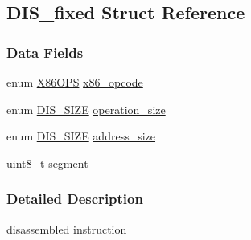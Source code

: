\hypertarget{struct_d_i_s__fixed}{
\subsection{DIS\_\-fixed Struct Reference}
\label{struct_d_i_s__fixed}
}
\subsubsection*{Data Fields}
\begin{DoxyCompactItemize}
\item 
enum \hyperlink{bytecode__disasm_8h_a6bf8b2b4d6261f0e88170a7d0585a5e2}{X86OPS} \hyperlink{struct_d_i_s__fixed_a372354efff5b025dc9324a03625338a2}{x86\_\-opcode}
\item 
enum \hyperlink{bytecode__disasm_8h_a6a0d419b6b61630b1f76a25ff39df84d}{DIS\_\-SIZE} \hyperlink{struct_d_i_s__fixed_a1a17e54c88513da8e5b1175a785c51ae}{operation\_\-size}
\item 
enum \hyperlink{bytecode__disasm_8h_a6a0d419b6b61630b1f76a25ff39df84d}{DIS\_\-SIZE} \hyperlink{struct_d_i_s__fixed_a772bedb1977f1ae07b9f55991f318bd8}{address\_\-size}
\item 
uint8\_\-t \hyperlink{struct_d_i_s__fixed_afbf231e07d12db4d0ebf0bc223679ae5}{segment}
\end{DoxyCompactItemize}


\subsubsection{Detailed Description}
disassembled instruction 

